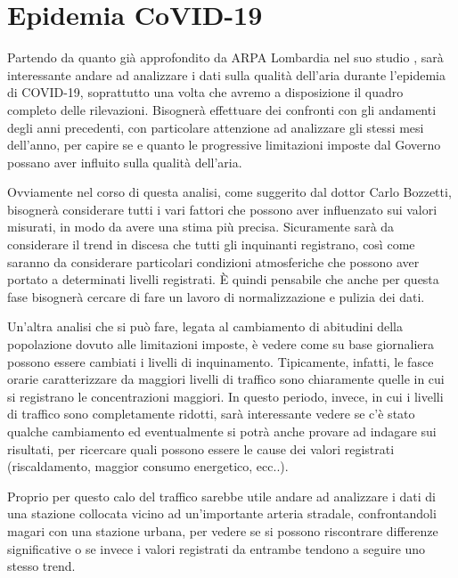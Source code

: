 \documentclass{article}
\begin{document}
\section{Epidemia CoVID-19}
\label{sec:covid}
Partendo da quanto già approfondito da ARPA Lombardia nel suo studio \cite{arpaCovid}, sarà interessante andare ad analizzare i dati sulla qualità dell'aria durante l'epidemia di COVID-19, soprattutto una volta che avremo a disposizione il quadro completo delle rilevazioni. Bisognerà effettuare dei confronti con gli andamenti degli anni precedenti, con particolare attenzione ad analizzare gli stessi mesi dell'anno, per capire se e quanto le progressive limitazioni imposte dal Governo possano aver influito sulla qualità dell'aria.

Ovviamente nel corso di questa analisi, come suggerito dal dottor Carlo Bozzetti, bisognerà considerare tutti i vari fattori che possono aver influenzato sui valori misurati, in modo da avere una stima più precisa. Sicuramente sarà da considerare il trend in discesa che tutti gli inquinanti registrano, così come saranno da considerare particolari condizioni atmosferiche che possono aver portato a determinati livelli registrati. È quindi pensabile che anche per questa fase bisognerà cercare di fare un lavoro di normalizzazione e pulizia dei dati.

Un'altra analisi che si può fare, legata al cambiamento di abitudini della popolazione dovuto alle limitazioni imposte, è vedere come su base giornaliera possono essere cambiati i livelli di inquinamento. Tipicamente, infatti, le fasce orarie caratterizzare da maggiori livelli di traffico sono chiaramente quelle in cui si registrano le concentrazioni maggiori. In questo periodo, invece, in cui i livelli di traffico sono completamente ridotti, sarà interessante vedere se c'è stato qualche cambiamento ed eventualmente si potrà anche provare ad indagare sui risultati, per ricercare quali possono essere le cause dei valori registrati (riscaldamento, maggior consumo energetico, ecc..).

Proprio per questo calo del traffico sarebbe utile andare ad analizzare i dati di una stazione collocata vicino ad un'importante arteria stradale, confrontandoli magari con una stazione urbana, per vedere se si possono riscontrare differenze significative o se invece i valori registrati da entrambe tendono a seguire uno stesso trend.
\end{document}
